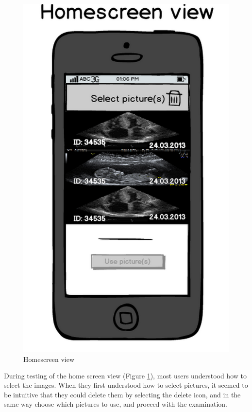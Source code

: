 \begin{figure}[H]
\centering
\includegraphics[scale=0.20]{img/mockups/homescreen_view.png}
\caption{Homescreen view}
\label{homemock}
\end{figure}
During testing of the home screen view (Figure \ref{homemock}), most users understood how to select the images. When they first understood how to select pictures, it seemed to be intuitive that they could delete them by selecting the delete icon, and in the same way choose which pictures to use, and proceed with the examination. 

